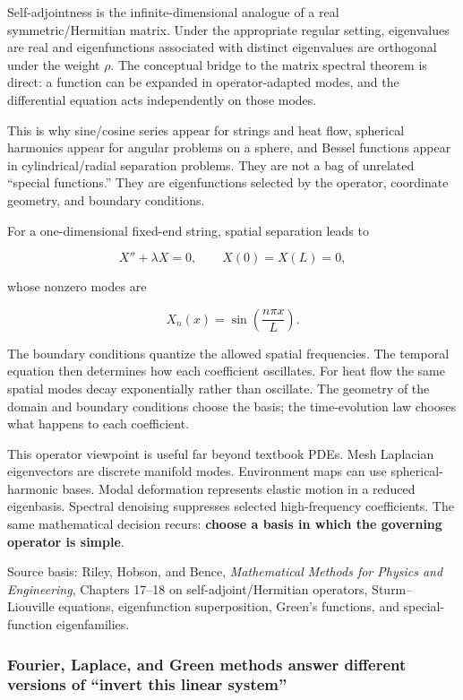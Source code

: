 Self-adjointness is the infinite-dimensional analogue of a real symmetric/Hermitian matrix. Under the appropriate regular setting, eigenvalues are real and eigenfunctions associated with distinct eigenvalues are orthogonal under the weight \(\rho\). The conceptual bridge to the matrix spectral theorem is direct: a function can be expanded in operator-adapted modes, and the differential equation acts independently on those modes.

This is why sine/cosine series appear for strings and heat flow, spherical harmonics appear for angular problems on a sphere, and Bessel functions appear in cylindrical/radial separation problems. They are not a bag of unrelated ``special functions.'' They are eigenfunctions selected by the operator, coordinate geometry, and boundary conditions.

For a one-dimensional fixed-end string, spatial separation leads to

\[
X''+\lambda X=0,
\qquad
X(0)=X(L)=0,
\]

whose nonzero modes are

\[
X_n(x)=
\sin\left(\frac{n\pi x}{L}\right).
\]

The boundary conditions quantize the allowed spatial frequencies. The temporal equation then determines how each coefficient oscillates. For heat flow the same spatial modes decay exponentially rather than oscillate. The geometry of the domain and boundary conditions choose the basis; the time-evolution law chooses what happens to each coefficient.

This operator viewpoint is useful far beyond textbook PDEs. Mesh Laplacian eigenvectors are discrete manifold modes. Environment maps can use spherical-harmonic bases. Modal deformation represents elastic motion in a reduced eigenbasis. Spectral denoising suppresses selected high-frequency coefficients. The same mathematical decision recurs: \textbf{choose a basis in which the governing operator is simple}.

Source basis: Riley, Hobson, and Bence, \emph{Mathematical Methods for Physics and Engineering}, Chapters 17--18 on self-adjoint/Hermitian operators, Sturm--Liouville equations, eigenfunction superposition, Green's functions, and special-function eigenfamilies.

\subsubsection{Fourier, Laplace, and Green methods answer different versions of ``invert this linear system''}\label{02-foundations-ii-ch025-fourier-laplace-and-green-methods-answer-different-versions-of-invert-this-linear-system}

